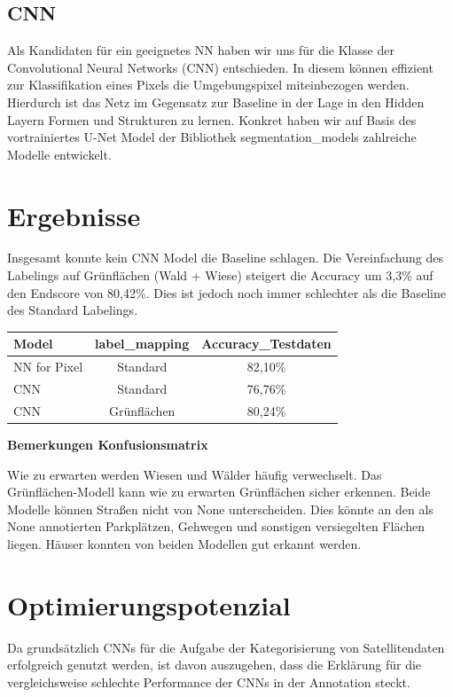 \subsection{CNN}
Als Kandidaten für ein geeignetes NN haben wir uns für die Klasse der Convolutional Neural Networks (CNN) entschieden.
In diesem können effizient zur Klassifikation eines Pixels die Umgebungspixel miteinbezogen werden.
Hierdurch ist das Netz im Gegensatz zur Baseline in der Lage in den Hidden Layern Formen und Strukturen zu lernen.
Konkret haben wir auf Basis des vortrainiertes U-Net Model der Bibliothek segmentation\_models zahlreiche Modelle entwickelt.


\section{Ergebnisse}
Insgesamt konnte kein CNN Model die Baseline schlagen.
Die Vereinfachung des Labelings auf Grünflächen (Wald + Wiese) steigert die Accuracy um 3,3\% auf den Endscore von 80,42\%.
Dies ist jedoch noch immer schlechter als die Baseline des Standard Labelings.\\

\begin{tabular}[h]{l|c|c}
Model & label\_mapping & Accuracy\_Testdaten \\
\hline
NN for Pixel & Standard & 82,10\% \\
\hline
CNN & Standard & 76,76\% \\
\hline
CNN & Grünflächen\footnotemark[1] & 80,24\% \\
\end{tabular}

\smallskip


\bigskip

\textbf{Bemerkungen Konfusionsmatrix}

Wie zu erwarten werden Wiesen und Wälder häufig verwechselt.
Das Grünflächen-Modell kann wie zu erwarten Grünflächen sicher erkennen.
Beide Modelle können Straßen nicht von None unterscheiden.
Dies könnte an den als None annotierten Parkplätzen, Gehwegen und sonstigen versiegelten Flächen liegen.
Häuser konnten von beiden Modellen gut erkannt werden.


\section{Optimierungspotenzial}
Da grundsätzlich CNNs für die Aufgabe der Kategorisierung von Satellitendaten erfolgreich genutzt werden,
ist davon auszugehen, dass die Erklärung für die vergleichsweise schlechte Performance der CNNs in der Annotation steckt.

